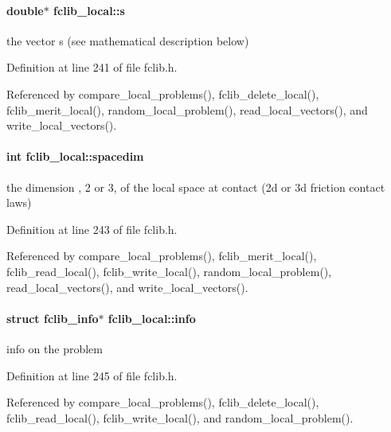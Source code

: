 \hypertarget{structfclib__local_abb6b3a07d92a86aac1c38e4d847207e3}{
\paragraph[{s}]{\setlength{\rightskip}{0pt plus 5cm}double$\ast$ fclib\-\_\-local\-::s}}\label{structfclib__local_abb6b3a07d92a86aac1c38e4d847207e3}


the vector s (see mathematical description below) 



Definition at line 241 of file fclib.\-h.



Referenced by compare\-\_\-local\-\_\-problems(), fclib\-\_\-delete\-\_\-local(), fclib\-\_\-merit\-\_\-local(), random\-\_\-local\-\_\-problem(), read\-\_\-local\-\_\-vectors(), and write\-\_\-local\-\_\-vectors().

\hypertarget{structfclib__local_accf07018913652e57be3a661b25d8bb7}{
\paragraph[{spacedim}]{\setlength{\rightskip}{0pt plus 5cm}int fclib\-\_\-local\-::spacedim}}\label{structfclib__local_accf07018913652e57be3a661b25d8bb7}


the dimension , 2 or 3, of the local space at contact (2d or 3d friction contact laws) 



Definition at line 243 of file fclib.\-h.



Referenced by compare\-\_\-local\-\_\-problems(), fclib\-\_\-merit\-\_\-local(), fclib\-\_\-read\-\_\-local(), fclib\-\_\-write\-\_\-local(), random\-\_\-local\-\_\-problem(), read\-\_\-local\-\_\-vectors(), and write\-\_\-local\-\_\-vectors().

\hypertarget{structfclib__local_ababce9da71cdb99e4928a596dde8bc89}{
\paragraph[{info}]{\setlength{\rightskip}{0pt plus 5cm}struct {\bf fclib\-\_\-info}$\ast$ fclib\-\_\-local\-::info}}\label{structfclib__local_ababce9da71cdb99e4928a596dde8bc89}


info on the problem 



Definition at line 245 of file fclib.\-h.



Referenced by compare\-\_\-local\-\_\-problems(), fclib\-\_\-delete\-\_\-local(), fclib\-\_\-read\-\_\-local(), fclib\-\_\-write\-\_\-local(), and random\-\_\-local\-\_\-problem().

